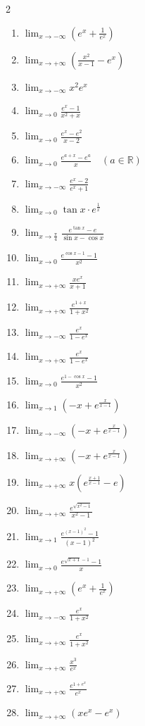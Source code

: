 \documentclass[12pt,a4paper]{article}
\begin{document}
\begin{multicols}{2}
\begin{enumerate}
\item $\lim_{x \to -\infty} \left(e^x + \frac{1}{e^x}\right)$
\item $\lim_{x \to +\infty} \left( \frac{x^2}{x-1} - e^x \right)$
\item $\lim_{x \to -\infty} x^2 e^x$
\item $\lim_{x \to 0} \frac{e^x - 1}{x^2 + x}$

\item $\lim_{x \to 0} \frac{e^x - e^2}{x-2}$
\item $\lim_{x \to 0} \frac{e^{a+x} - e^a}{x} \quad (a \in \mathbb{R})$
\item $\lim_{x \to -\infty} \frac{e^x - 2}{e^x + 1}$
\item $\lim_{x \to 0} \tan x \cdot e^{\frac{1}{x}}$

\item $\lim_{x \to \frac{\pi}{4}} \frac{e^{\tan x} - e}{\sin x - \cos x}$
\item $\lim_{x \to 0} \frac{e^{\cos x - 1} - 1}{x^2}$
\item $\lim_{x \to +\infty} \frac{x e^x}{x+1}$
\item $\lim_{x \to +\infty} \frac{e^{1+x}}{1+x^2}$

\item $\lim_{x \to -\infty} \frac{e^x}{1 - e^x}$
\item $\lim_{x \to +\infty} \frac{e^x}{1 - e^x}$
\item $\lim_{x \to 0} \frac{e^{1-\cos x} - 1}{x^2}$
\item $\lim_{x \to 1} \left( -x + e^{\frac{x}{x-1}} \right)$

\item $\lim_{x \to -\infty} \left( -x + e^{\frac{x}{x-1}} \right)$
\item $\lim_{x \to +\infty} \left( -x + e^{\frac{x}{x-1}} \right)$
\item $\lim_{x \to +\infty} x \left( e^{\frac{x+1}{x-1}} - e \right)$
\item $\lim_{x \to +\infty} \frac{e^{\sqrt{x^2 - 1}}}{x^2 - 1}$

\item $\lim_{x \to 1} \frac{e^{(x-1)^2} - 1}{(x-1)^2}$
\item $\lim_{x \to 0} \frac{e^{\sqrt{x+1}-1} - 1}{x}$
\item $\lim_{x \to +\infty} \left( e^x + \frac{1}{e^x} \right)$
\item $\lim_{x \to -\infty} \frac{e^x}{1+x^2}$

\item $\lim_{x \to +\infty} \frac{e^x}{1+x^2}$
\item $\lim_{x \to +\infty} \frac{x^3}{e^x}$
\item $\lim_{x \to +\infty} \frac{e^{1+e^x}}{e^x}$
\item $\lim_{x \to +\infty} (x e^x - e^x)$


\end{enumerate}
\end{multicols}
\end{document}
